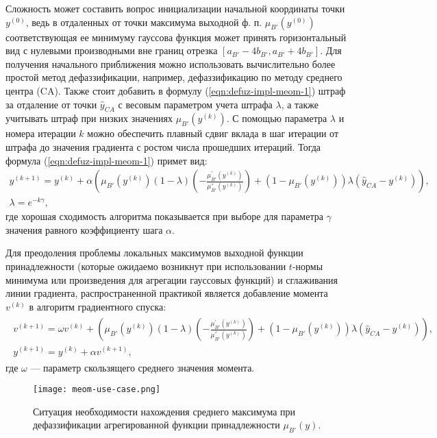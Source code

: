 Сложность может составить вопрос инициализации начальной координаты точки $y^{(0)}$, ведь в отдаленных от точки максимума выходной ф. п. $\mu_{B'}(y^{(0)})$  соответствующая ее минимуму гауссова функция может принять горизонтальный вид с нулевыми производными вне границ отрезка $[a_{B'} - 4 b_{B'}, a_{B'} + 4 b_{B'}]$. Для получения начального приближения можно использовать вычислительно более простой метод дефаззификации, например, дефаззификацию по методу среднего центра (CA). Также стоит добавить в формулу (\ref{eqn:defuz-impl-meom-1}) штраф за отдаление от точки $\hat{y}_{CA}$ с весовым параметром учета штрафа $\lambda$, а также учитывать штраф при низких значениях $\mu_{B'}(y^{(k)})$. С помощью параметра $\lambda$ и номера итерации $k$ можно обеспечить плавный сдвиг вклада в шаг итерации от штрафа до значения градиента с ростом числа прошедших итераций. Тогда формула (\ref{eqn:defuz-impl-meom-1}) примет вид:
\begin{gather*}
	y^{(k+1)} = y^{(k)} + \alpha \left(\mu_{B'}(y^{(k)})(1-\lambda)\left(-\frac{\mu_{B'}^{'}(y^{(k)})}{\mu_{B'}^{''}(y^{(k)})}\right) + (1-\mu_{B'}(y^{(k)}))\lambda (\hat{y}_{CA} - y^{(k)})\right),\\
	\lambda = e^{-k \gamma},
	\label{eqn:defuz-impl-meom-2}
\end{gather*}
где хорошая сходимость алгоритма показывается при выборе для параметра $\gamma$ значения равного коэффициенту шага $\alpha$.

Для преодоления проблемы локальных максимумов выходной функции принадлежности (которые ожидаемо возникнут при использовании $t$-нормы минимума или произведения для агрегации гауссовых функций) и сглаживания линии градиента, распространенной практикой является добавление момента $v^(k)$ в алгоритм градиентного спуска:
\begin{gather}
\begin{split}
	v^{(k+1)} = \omega v^{(k)} + (\mu_{B'}(y^{(k)})(1-\lambda)\left(-\frac{\mu_{B'}^{'}(y^{(k)})}{\mu_{B'}^{''}(y^{(k)})}\right) + (1-\mu_{B'}(y^{(k)}))\lambda (\hat{y}_{CA} - y^{(k)})),\\
	y^{(k+1)} = y^{(k)} + \alpha v^{(k+1)},
\end{split}
\label{eqn:defuz-impl-meom-3}
\end{gather}
где $\omega$ --- параметр скользящего среднего значения момента.

\begin{figure}[ht]
	\centering
	\texttt{[image: meom-use-case.png]}
	\caption{Ситуация необходимости нахождения среднего максимума при дефаззификации агрегированной функции принадлежности $\mu_{B'}(y)$.}
	\label{fig:defuz-meom-use-case}	
\end{figure}

